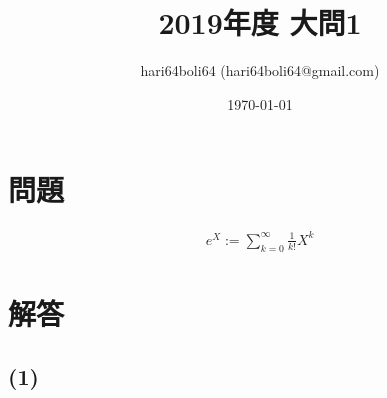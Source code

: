 \documentclass[a4paper, 10pt, dvipdfmx]{jlreq}
\begin{document}
\title{2019年度 大問1}
\author{hari64boli64 (hari64boli64@gmail.com)}
\date{\today}
\maketitle


\section{問題}

\begin{align*}
    e^X:=\sum_{k=0}^\infty \frac{1}{k!}X^k
\end{align*}

\section{解答}

\subsection*{(1)}
\end{document}
